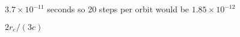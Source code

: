 \documentclass{article}
\begin{document}
$3.7 \times 10^{-11}$ seconds so 20 steps per orbit would be $1.85 \times 10^{-12}$
\pagebreak

$2 r_{e} / (3 c)$
\pagebreak
\end{document}
